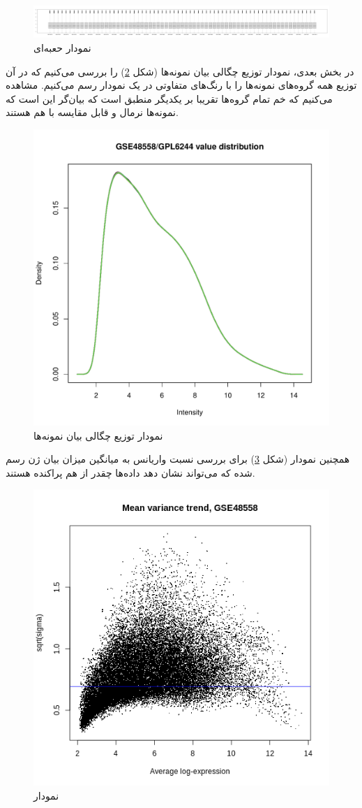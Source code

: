 \documentclass{article}
\begin{document}
\begin{figure}[h!]
	\centering
	\includegraphics[width=0.8\columnwidth]{figs/boxplot.pdf}
	\caption{نمودار حعبه‌ای}
	\label{fig:boxplot}
\end{figure}

در بخش بعدی، نمودار توزیع چگالی بیان نمونه‌ها (شکل \ref{fig:exp-val-dist}) را بررسی می‌کنیم که در آن توزیع همه گروه‌های نمونه‌ها را با رنگ‌های متفاوتی در یک نمودار رسم می‌کنیم. مشاهده می‌کنیم که خم تمام گروه‌ها تقریبا بر یکدیگر منطبق است که بیان‌گر این است که نمونه‌ها نرمال و قابل مقایسه با هم هستند.

\begin{figure}[h!]
	\centering
	\includegraphics[width=0.5\columnwidth]{figs/exp-val-dist.pdf}
	\caption{نمودار توزیع چگالی بیان نمونه‌ها}
	\label{fig:exp-val-dist}
\end{figure}

همچنین نمودار  (شکل \ref{fig:mean-var}) برای بررسی نسبت واریانس به میانگین میزان بیان ژن رسم شده که می‌تواند نشان دهد داده‌‌ها چقدر از هم پراکنده هستند.

\begin{figure}[h!]
	\centering
	\includegraphics[width=0.5\columnwidth]{figs/mean-var.png}
	\caption{نمودار }
	\label{fig:mean-var}
\end{figure}
\end{document}
